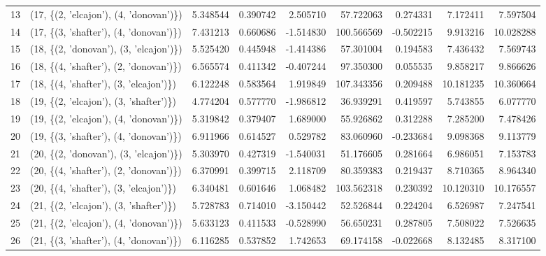 \begin{tabular}{llrrrrrrr}
13 &  (17, \{(2, 'elcajon'), (4, 'donovan')\}) &   5.348544 &   0.390742 &   2.505710 &    57.722063 &   0.274331 &   7.172411 &   7.597504 \\
14 &  (17, \{(3, 'shafter'), (4, 'donovan')\}) &   7.431213 &   0.660686 &  -1.514830 &   100.566569 &  -0.502215 &   9.913216 &  10.028288 \\
15 &  (18, \{(2, 'donovan'), (3, 'elcajon')\}) &   5.525420 &   0.445948 &  -1.414386 &    57.301004 &   0.194583 &   7.436432 &   7.569743 \\
16 &  (18, \{(4, 'shafter'), (2, 'donovan')\}) &   6.565574 &   0.411342 &  -0.407244 &    97.350300 &   0.055535 &   9.858217 &   9.866626 \\
17 &  (18, \{(4, 'shafter'), (3, 'elcajon')\}) &   6.122248 &   0.583564 &   1.919849 &   107.343356 &   0.209488 &  10.181235 &  10.360664 \\
18 &  (19, \{(2, 'elcajon'), (3, 'shafter')\}) &   4.774204 &   0.577770 &  -1.986812 &    36.939291 &   0.419597 &   5.743855 &   6.077770 \\
19 &  (19, \{(2, 'elcajon'), (4, 'donovan')\}) &   5.319842 &   0.379407 &   1.689000 &    55.926862 &   0.312288 &   7.285200 &   7.478426 \\
20 &  (19, \{(3, 'shafter'), (4, 'donovan')\}) &   6.911966 &   0.614527 &   0.529782 &    83.060960 &  -0.233684 &   9.098368 &   9.113779 \\
21 &  (20, \{(2, 'donovan'), (3, 'elcajon')\}) &   5.303970 &   0.427319 &  -1.540031 &    51.176605 &   0.281664 &   6.986051 &   7.153783 \\
22 &  (20, \{(4, 'shafter'), (2, 'donovan')\}) &   6.370991 &   0.399715 &   2.118709 &    80.359383 &   0.219437 &   8.710365 &   8.964340 \\
23 &  (20, \{(4, 'shafter'), (3, 'elcajon')\}) &   6.340481 &   0.601646 &   1.068482 &   103.562318 &   0.230392 &  10.120310 &  10.176557 \\
24 &  (21, \{(2, 'elcajon'), (3, 'shafter')\}) &   5.728783 &   0.714010 &  -3.150442 &    52.526844 &   0.224204 &   6.526987 &   7.247541 \\
25 &  (21, \{(2, 'elcajon'), (4, 'donovan')\}) &   5.633123 &   0.411533 &  -0.528990 &    56.650231 &   0.287805 &   7.508022 &   7.526635 \\
26 &  (21, \{(3, 'shafter'), (4, 'donovan')\}) &   6.116285 &   0.537852 &   1.742653 &    69.174158 &  -0.022668 &   8.132485 &   8.317100 \\
\bottomrule
\end{tabular}
